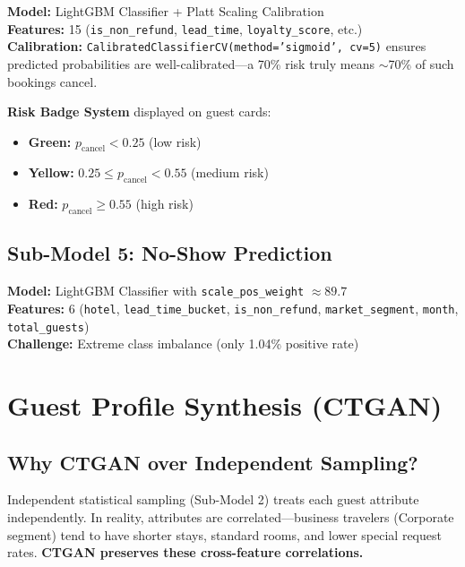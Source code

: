 \documentclass[12pt,a4paper,openany]{report}
\begin{document}
\textbf{Model:} LightGBM Classifier + Platt Scaling Calibration\\
\textbf{Features:} 15 (\texttt{is\_non\_refund}, \texttt{lead\_time}, \texttt{loyalty\_score}, etc.)\\
\textbf{Calibration:} \texttt{CalibratedClassifierCV(method='sigmoid', cv=5)} ensures predicted probabilities are well-calibrated---a 70\% risk truly means $\sim$70\% of such bookings cancel.

\textbf{Risk Badge System} displayed on guest cards:
\begin{itemize}
  \item \textcolor{green!60!black}{\textbf{Green:}} $p_{\text{cancel}} < 0.25$ (low risk)
  \item \textcolor{yellow!80!black}{\textbf{Yellow:}} $0.25 \leq p_{\text{cancel}} < 0.55$ (medium risk)
  \item \textcolor{red!70!black}{\textbf{Red:}} $p_{\text{cancel}} \geq 0.55$ (high risk)
\end{itemize}

\subsection{Sub-Model 5: No-Show Prediction}

\textbf{Model:} LightGBM Classifier with \texttt{scale\_pos\_weight} $\approx 89.7$\\
\textbf{Features:} 6 (\texttt{hotel}, \texttt{lead\_time\_bucket}, \texttt{is\_non\_refund}, \texttt{market\_segment}, \texttt{month}, \texttt{total\_guests})\\
\textbf{Challenge:} Extreme class imbalance (only 1.04\% positive rate)


\section{Guest Profile Synthesis (CTGAN)}

\subsection{Why CTGAN over Independent Sampling?}

Independent statistical sampling (Sub-Model 2) treats each guest attribute independently. In reality, attributes are correlated---business travelers (Corporate segment) tend to have shorter stays, standard rooms, and lower special request rates. \textbf{CTGAN preserves these cross-feature correlations.}
\end{document}
